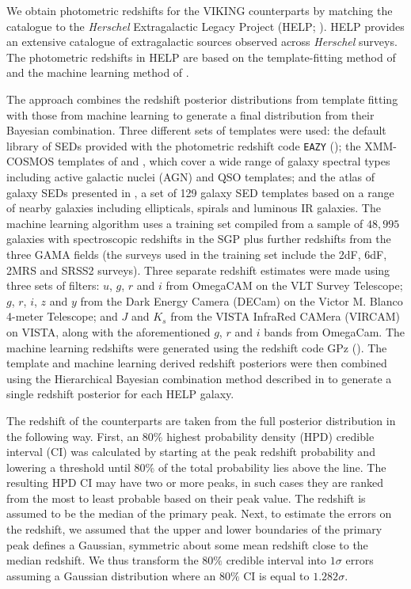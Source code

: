 We obtain photometric redshifts for the VIKING counterparts by matching the catalogue to the \textit{Herschel} Extragalactic Legacy Project (HELP; \citealt{Vaccari_2016, Shirley_2019}). HELP provides an extensive catalogue of extragalactic sources observed across \textit{Herschel} surveys. The photometric redshifts in HELP are based on the template-fitting method of \citealt{Duncan_2018a} and the machine learning method of \citealt{Duncan_2018b}.

The approach combines the redshift posterior distributions from template fitting with those from machine learning to generate a final distribution from their Bayesian combination. Three different sets of templates were used: the default library of SEDs provided with the photometric redshift code \texttt{EAZY} (\citealt{Brammer_2008}); the XMM-COSMOS templates of \citealt{Salvato_2009} and \citealt{Salvato_2011}, which cover a wide range of galaxy spectral types including active galactic nuclei (AGN) and QSO templates; and the atlas of galaxy SEDs presented in \citealt{Brown_2014}, a set of 129 galaxy SED templates based on a range of nearby galaxies including ellipticals, spirals and luminous IR galaxies. The machine learning algorithm uses a training set compiled from a sample of $48,995$ galaxies with spectroscopic redshifts in the SGP plus further redshifts from the three GAMA fields (the surveys used in the training set include the 2dF, 6dF, 2MRS and SRSS2 surveys). Three separate redshift estimates were made using three sets of filters: $u$, $g$, $r$ and $i$ from OmegaCAM on the VLT Survey Telescope; $g$, $r$, $i$, $z$ and $y$ from the Dark Energy Camera (DECam) on the Victor M. Blanco 4-meter Telescope; and $J$ and $K_s$ from the VISTA InfraRed CAMera (VIRCAM) on VISTA, along with the aforementioned $g$, $r$ and $i$ bands from OmegaCam. The machine learning redshifts were generated using the redshift code GPz (\citealt{Almosallam_2016}). The template and machine learning derived redshift posteriors were then combined using the Hierarchical Bayesian combination method described in \citealt{Dahlen_2013} to generate a single redshift posterior for each HELP galaxy.

The redshift of the counterparts are taken from the full posterior distribution in the following way. First, an $80\%$ highest probability density (HPD) credible interval (CI) was calculated by starting at the peak redshift probability and lowering a threshold until $80\%$ of the total probability lies above the line. The resulting HPD CI may have two or more peaks, in such cases they are ranked from the most to least probable based on their peak value. The redshift is assumed to be the median of the primary peak. Next, to estimate the errors on the redshift, we assumed that the upper and lower boundaries of the primary peak defines a Gaussian, symmetric about some mean redshift close to the median redshift. We thus transform the $80\%$ credible interval into $1\sigma$ errors assuming a Gaussian distribution where an $80\%$ CI is equal to $1.282\sigma$.

